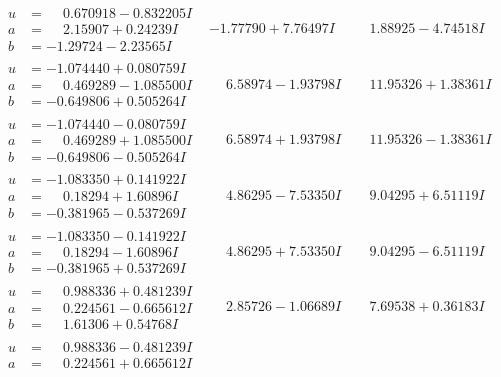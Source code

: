 \documentclass[1p]{elsarticle_modified}
\theoremstyle{definition}
\begin{document}
$$\begin{array}{c|c|c}
\begin{aligned}
u &= \phantom{-}0.670918 - 0.832205 I \\
a &= \phantom{-}2.15907 + 0.24239 I \\
b &= -1.29724 - 2.23565 I\end{aligned}
 & -1.77790 + 7.76497 I & \phantom{-}1.88925 - 4.74518 I \\ \hline\begin{aligned}
u &= -1.074440 + 0.080759 I \\
a &= \phantom{-}0.469289 - 1.085500 I \\
b &= -0.649806 + 0.505264 I\end{aligned}
 & \phantom{-}6.58974 - 1.93798 I & \phantom{-}11.95326 + 1.38361 I \\ \hline\begin{aligned}
u &= -1.074440 - 0.080759 I \\
a &= \phantom{-}0.469289 + 1.085500 I \\
b &= -0.649806 - 0.505264 I\end{aligned}
 & \phantom{-}6.58974 + 1.93798 I & \phantom{-}11.95326 - 1.38361 I \\ \hline\begin{aligned}
u &= -1.083350 + 0.141922 I \\
a &= \phantom{-}0.18294 + 1.60896 I \\
b &= -0.381965 - 0.537269 I\end{aligned}
 & \phantom{-}4.86295 - 7.53350 I & \phantom{-}9.04295 + 6.51119 I \\ \hline\begin{aligned}
u &= -1.083350 - 0.141922 I \\
a &= \phantom{-}0.18294 - 1.60896 I \\
b &= -0.381965 + 0.537269 I\end{aligned}
 & \phantom{-}4.86295 + 7.53350 I & \phantom{-}9.04295 - 6.51119 I \\ \hline\begin{aligned}
u &= \phantom{-}0.988336 + 0.481239 I \\
a &= \phantom{-}0.224561 - 0.665612 I \\
b &= \phantom{-}1.61306 + 0.54768 I\end{aligned}
 & \phantom{-}2.85726 - 1.06689 I & \phantom{-}7.69538 + 0.36183 I \\ \hline\begin{aligned}
u &= \phantom{-}0.988336 - 0.481239 I \\
a &= \phantom{-}0.224561 + 0.665612 I \\

\end{aligned}
\end{array}$$
\end{document}
